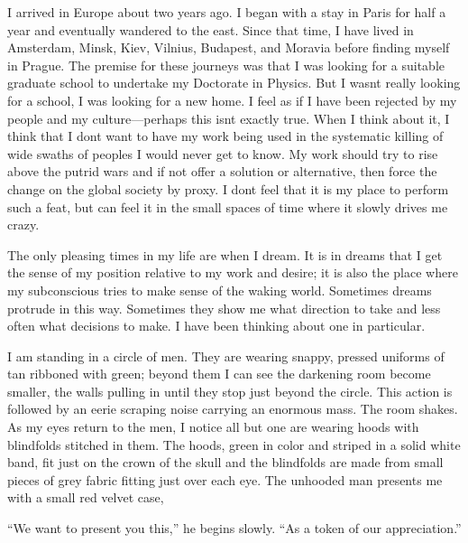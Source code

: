 I arrived in Europe about two years ago. I began with a stay in Paris
for half a year and eventually wandered to the east. Since that time, I
have lived in Amsterdam, Minsk, Kiev, Vilnius, Budapest, and Moravia
before finding myself in Prague. The premise for these journeys was that
I was looking for a suitable graduate school to undertake my Doctorate
in Physics. But I wasn\textquotesingle t really looking for a school, I
was looking for a new home. I feel as if I have been rejected by my
people and my culture---perhaps this isn\textquotesingle t exactly true.
When I think about it, I think that I don\textquotesingle t want to have
my work being used in the systematic killing of wide swaths of peoples I
would never get to know. My work should try to rise above the putrid
wars and if not offer a solution or alternative, then force the change
on the global society by proxy. I don\textquotesingle t feel that it is
my place to perform such a feat, but can feel it in the small spaces of
time where it slowly drives me crazy.

The only pleasing times in my life are when I dream. It is in dreams
that I get the sense of my position relative to my work and desire; it
is also the place where my subconscious tries to make sense of the
waking world. Sometimes dreams protrude in this way. Sometimes they show
me what direction to take and less often what decisions to make. I have
been thinking about one in particular.

I am standing in a circle of men. They are wearing snappy, pressed
uniforms of tan ribboned with green; beyond them I can see the darkening
room become smaller, the walls pulling in until they stop just beyond
the circle. This action is followed by an eerie scraping noise carrying
an enormous mass. The room shakes. As my eyes return to the men, I
notice all but one are wearing hoods with blindfolds stitched in them.
The hoods, green in color and striped in a solid white band, fit just on
the crown of the skull and the blindfolds are made from small pieces of
grey fabric fitting just over each eye. The unhooded man presents me
with a small red velvet case,

``We want to present you this,'' he begins slowly. ``As a token of our
appreciation.''

